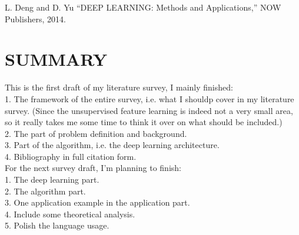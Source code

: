 \documentclass[conference]{IEEEtran}
\begin{document}
\begin{thebibliography}{99}
 L. Deng and D. Yu ``DEEP LEARNING: Methods and Applications,'' NOW Publishers, 2014.



\end{thebibliography}

\section{SUMMARY}

This is the first draft of my literature survey, I mainly finished: \\
1. The framework of the entire survey, i.e. what I shouldp cover in my literature survey. (Since the unsupervised feature learning is indeed not a very small area, so it really takes me some time to think it over on what should be included.) \\
2. The part of problem definition and background. \\
3. Part of the algorithm, i.e. the deep learning architecture. \\
4. Bibliography in full citation form. \\

For the next survey draft, I'm planning to finish: \\
1. The deep learning part. \\
2. The algorithm part. \\
3. One application example in the application part. \\
4. Include some theoretical analysis. \\
5. Polish the language usage.

\end{document}
